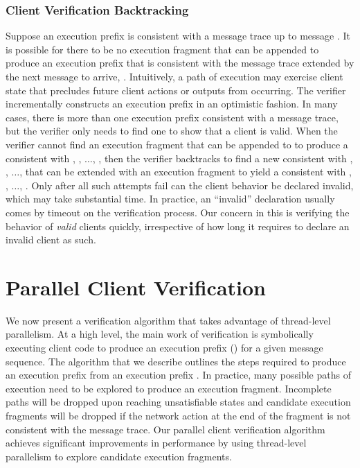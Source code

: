 \subsubsection{Client Verification Backtracking}
Suppose an execution prefix  is consistent with
a message trace up to message . It is possible for
there to be no execution fragment that can be appended to produce an
execution prefix \execPrefix{\msgNmbr} that is consistent with the
message trace extended by the next message to arrive, \msg{\msgNmbr}.
Intuitively, a path of execution may exercise
client state that precludes future client actions or outputs from
occurring. The verifier incrementally constructs an execution prefix
in an optimistic fashion. In many cases, there is more than one
execution prefix consistent with a message trace, but the verifier
only needs to find one to show that a client is valid. When the
verifier cannot find an execution fragment that can be appended to
 to produce a \execPrefix{\msgNmbr} consistent
with , , $\ldots$, \msg{\msgNmbr}, then the verifier
backtracks to find a new  consistent with
, , $\ldots$,  that can be extended with
an execution fragment to yield a \execPrefixAlt{\msgNmbr} consistent
with , , $\ldots$, \msg{\msgNmbr}.  Only after all such
attempts fail can the client behavior be declared invalid, which may
take substantial time. In practice, an ``invalid'' declaration usually
comes by timeout on the verification process. Our concern in this
\paper is verifying the behavior of \textit{valid} clients quickly,
irrespective of how long it requires to declare an invalid client as
such.

\section{Parallel Client Verification }

We now present a verification algorithm that takes advantage of
thread-level parallelism. At a high level, the main work of
verification is symbolically executing client code to produce an
execution prefix () for a given
message sequence. The algorithm that we describe outlines the steps
required to produce an execution prefix \execPrefix{\msgNmbr} from an
execution prefix . In practice, many possible
paths of execution need to be explored to produce an execution
fragment. Incomplete paths will be dropped upon reaching unsatisfiable
states and candidate execution fragments will be dropped if the
network action at the end of the fragment is not consistent with the
message trace. Our parallel client verification algorithm
achieves significant improvements in performance by using
thread-level parallelism to explore candidate execution fragments.


